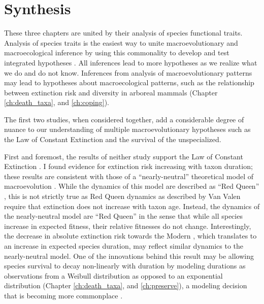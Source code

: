 \section{Synthesis}

These three chapters are united by their analysis of species functional traits. Analysis of species traits is the easiest way to unite macroevolutionary and macroecological inference by using this commonality to develop and test integrated hypotheses \citep{Mcgill2006,Weber2017}. All inferences lead to more hypotheses as we realize what we do and do not know. Inferences from analysis of macroevolutionary patterns may lead to hypotheses about macroecological patterns, such as the relationship between extinction risk and diversity in arboreal mammals (Chapter \ref{ch:death_taxa}, and \ref{ch:coping}).

The first two studies, when considered together, add a considerable degree of nuance to our understanding of multiple macroevolutionary hypotheses such as the Law of Constant Extinction and the survival of the unspecialized.

First and foremost, the results of neither study support the Law of Constant Extinction \citep{VanValen1973}. I found evidence for extinction risk increasing with taxon duration; these results are consistent with those of a ``nearly-neutral'' theoretical model of macroevolution \citep{Rosindell2015a}. While the dynamics of this model are described as ``Red Queen'' \citep{Rosindell2015a}, this is not strictly true as Red Queen dynamics as described by Van Valen \citep{VanValen1973} require that extinction does not increase with taxon age. Instead, the dynamics of the nearly-neutral model are ``Red Queen'' in the sense that while all species increase in expected fitness, their relative fitnesses do not change. Interestingly, the decrease in absolute extinction risk towards the Modern \citep{Raup1982a,Foote2003}, which translates to an increase in expected species duration, may reflect similar dynamics to the nearly-neutral model. One of the innovations behind this result may be allowing species survival to decay non-linearly with duration by modeling durations as observations from a Weibull distribution as opposed to an exponential distribution (Chapter \ref{ch:death_taxa}, and \ref{ch:preserve}), a modeling decision that is becoming more commonplace \citep{Crampton2016a,Ezard2012b}.

